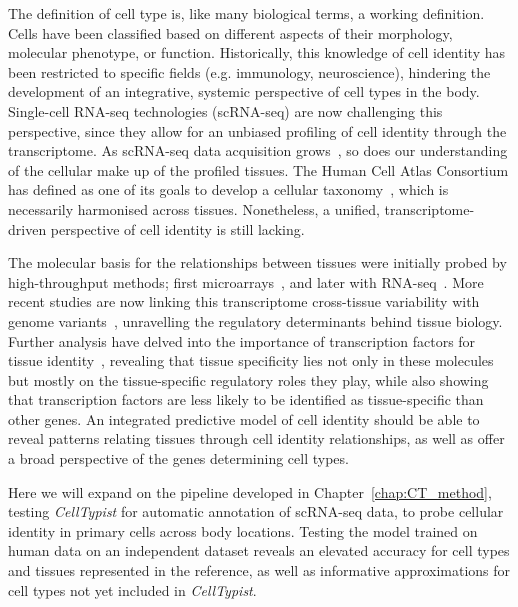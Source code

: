 The definition of cell type is, like many biological terms, a working definition. Cells have been classified based on different aspects of their morphology, molecular phenotype, or function. Historically, this knowledge of cell identity has been restricted to specific fields (e.g. immunology, neuroscience), hindering the development of an integrative, systemic perspective of cell types in the body. Single-cell RNA-seq technologies (scRNA-seq) are now challenging this perspective, since they allow for an unbiased profiling of cell identity through the transcriptome. As scRNA-seq data acquisition grows~\citep{svensson_exponential_2018}, so does our understanding of the cellular make up of the profiled tissues. The Human Cell Atlas Consortium has defined as one of its goals to develop a cellular taxonomy~\citep{regev_human_2017}, which is necessarily harmonised across tissues. Nonetheless, a unified, transcriptome-driven perspective of cell identity is still lacking.

The molecular basis for the relationships between tissues were initially probed by high-throughput methods; first microarrays~\citep{enard_intra-_2002}, and later with RNA-seq~\citep{mortazavi_mapping_2008,brawand_evolution_2011,barbosa-morais_evolutionary_2012}. More recent studies are now linking this transcriptome cross-tissue variability with genome variants~\citep{consortium_genotype-tissue_2015,gtex_consortium_genetic_2017}, unravelling the regulatory determinants behind tissue biology. Further analysis have delved into the importance of transcription factors for tissue identity~\citep{sonawane_understanding_2017}, revealing that tissue specificity lies not only in these molecules but mostly on the tissue-specific regulatory roles they play, while also showing that transcription factors are less likely to be identified as tissue-specific than other genes. An integrated predictive model of cell identity should be able to reveal patterns relating tissues through cell identity relationships, as well as offer a broad perspective of the genes determining cell types.

Here we will expand on the pipeline developed in Chapter~\ref{chap:CT_method}, testing \textit{CellTypist} for automatic annotation of scRNA-seq data, to probe cellular identity in primary cells across body locations. Testing the model trained on human data on an independent dataset reveals an elevated accuracy for cell types and tissues represented in the reference, as well as informative approximations for cell types not yet included in \textit{CellTypist}. 


